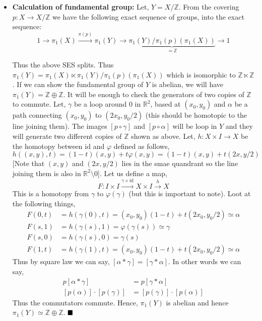 \documentclass[11pt]{article}
\newcommand{\bb}[1]{\mathbb{#1}}
\newcommand{\Z}{\bb{Z}}
\newcommand{\R}{\mathbb{R}}
\newcommand{\id}{\mathrm{id}}
\begin{document}
\begin{itemize}
  \item \textbf{\textsf{Calculation of fundamental group: }} Let, $Y = X/\Z$. From the covering $p: X \to X/\Z$ we have the following exact sequence of groups, 
  into the exact sequence:
      $$
      1\to\pi_1(X)\xrightarrow{\pi(p)}\pi_1(Y)\to \underbrace{\pi_1(Y)/\pi_1(p)(\pi_1(X))}_{\simeq \Z}\to 1
      $$
  
  Thus the above SES splits. Thus $\pi_1(Y)= \pi_1(X) \ltimes \pi_1(Y)/\pi_1(p)(\pi_1(X))$ which is isomorphic to $\Z \ltimes \Z$. If we can show the fundamental group of $Y$ is abelian, we will have $\pi_1(Y)= \Z \oplus \Z$. It will be enough to check the generators of two copies of $\Z$ to commute. Let, $\gamma$ be a loop around $0$ in $\R^2$, based at $(x_0,y_0)$ and $\alpha$ be a path connecting $(x_0,y_0)$ to $(2x_0,y_0/2)$ (this should be homotopic to the line joining them). The images $[p\circ \gamma]$ and $[p\circ \alpha]$ will be loop in $Y$ and they will generate two different copies of $\Z$ shown as above. Let, $h:X \times I \to X$ be the homotopy between $\id$ and $\varphi$ defined as follows, $$h((x,y),t)=(1-t)(x,y)+t\varphi(x,y)= (1-t)(x,y) + t(2x,y/2)$$
  [Note that $(x,y)$ and $(2x,y/2)$ lies in the smae quandrant so the line joining them is also in $\R^2\setminus \qty{0}$]. Let us define a map, $$F : I \times I \xrightarrow{\gamma \times \id}X \times I \xrightarrow{h}X$$ 
 This is a homotopy from $\gamma$ to $\varphi(\gamma)$ (but this is important to note). Loot at the following things, \begin{align*}
  F(0,t)&=h(\gamma(0),t)= (x_0,y_0)(1-t)+ t(2x_0,y_0/2) \simeq \alpha  \\
  F(s,1)&= h(\gamma(s),1) = \varphi(\gamma(s)) \simeq \gamma \\
  F(s,0)&= h(\gamma(s),0)= \gamma(s)\\
  F(1,t)&= h(\gamma(1),t)= (x_0,y_0)(1-t)+t(2x_0,y_0/2) \simeq \alpha
 \end{align*}
Thus by square law we can say, $[\alpha \ast \gamma] = [\gamma \ast \alpha]$. In other words we can say, \begin{align*}
  p[\alpha \ast \gamma] &= p[\gamma \ast \alpha]\\
  [p(\alpha)]\cdot [p(\gamma)] &= [p(\gamma)]\cdot [p(\alpha)]
\end{align*}
Thus the commutators commute. Hence, $\pi_1(Y)$ is abelian and hence $\pi_1(Y)\simeq \Z \oplus \Z$.  $\hfill \blacksquare$
\end{itemize}
\end{document}
